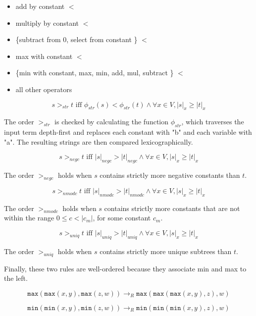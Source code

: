 \begin{itemize}
  \item add by constant $<$
  \item multiply by constant $<$
  \item \{subtract from 0, select from constant \} $<$ 
  \item max with constant $<$
  \item \{min with constant, max, min, add, mul, subtract \} $<$
  \item all other operators
\end{itemize}

\begin{equation}
s >_{str} t \textrm{ iff } \phi_{str}(s) < \phi_{str}(t) \wedge \forall x \in V, |s|_x \geq |t|_x
\end{equation}

The order $>_{str}$ is checked by calculating the function $\phi_{str}$, which traverses the input term depth-first and replaces each constant with "b" and each variable with "a". The resulting strings are then compared lexicographically.

\begin{equation}
s >_{negc} t \textrm{ iff } |s|_{negc} > |t|_{negc}  \wedge \forall x \in V, |s|_x \geq |t|_x
\end{equation}

The order $>_{negc}$ holds when $s$ contains strictly more negative constants than $t$.

\begin{equation}
s >_{nmodc} t \textrm{ iff } |s|_{nmodc} > |t|_{nmodc}  \wedge \forall x \in V, |s|_x \geq |t|_x
\end{equation}

The order $>_{nmodc}$ holds when $s$ contains strictly more constants that are not within the range $0 \leq c < |c_m|$, for some constant $c_m$. 

\begin{equation}
s >_{uniq} t \textrm{ iff } |s|_{uniq} > |t|_{uniq}  \wedge \forall x \in V, |s|_x \geq |t|_x
\end{equation}

The order $>_{uniq}$ holds when $s$ contains strictly more unique subtrees than $t$.

Finally, these two rules are well-ordered because they associate min and max to the left.

\begin{equation}
\tag{max106}
\texttt{max}(\texttt{max}(x,y), \texttt{max}(z,w)) \rightarrow_R \texttt{max}(\texttt{max}(\texttt{max}(x,y),z),w)
\end{equation}

\begin{equation}
\tag{min106}
\texttt{min}(\texttt{min}(x,y), \texttt{min}(z,w)) \rightarrow_R \texttt{min}(\texttt{min}(\texttt{min}(x,y),z),w)
\end{equation}
